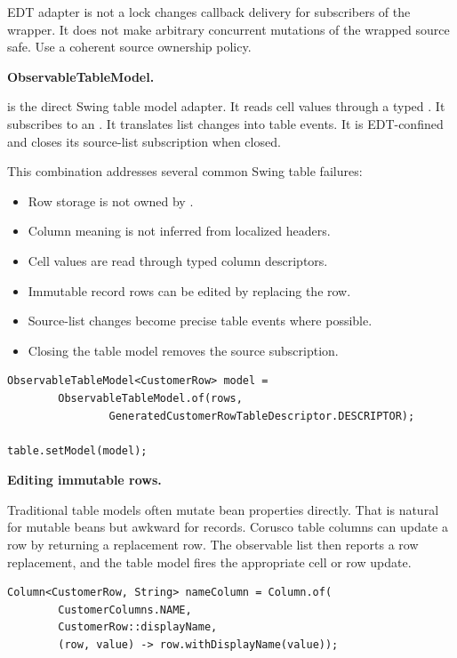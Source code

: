 \begin{pitfallbox}{EDT adapter is not a lock}
 changes callback delivery for subscribers of the
wrapper. It does not make arbitrary concurrent mutations of the wrapped source
safe. Use a coherent source ownership policy.
\end{pitfallbox}

\textbf{ObservableTableModel.}

 is the direct Swing table model adapter. It reads
cell values through a typed . It subscribes to an
. It translates list changes into table events. It is
EDT-confined and closes its source-list subscription when closed.

This combination addresses several common Swing table failures:

\begin{itemize}
\item Row storage is not owned by .
\item Column meaning is not inferred from localized headers.
\item Cell values are read through typed column descriptors.
\item Immutable record rows can be edited by replacing the row.
\item Source-list changes become precise table events where possible.
\item Closing the table model removes the source subscription.
\end{itemize}

\begin{lstlisting}[caption={Descriptor-backed observable table model.}]
ObservableTableModel<CustomerRow> model =
        ObservableTableModel.of(rows,
                GeneratedCustomerRowTableDescriptor.DESCRIPTOR);

table.setModel(model);
\end{lstlisting}

\textbf{Editing immutable rows.}

Traditional table models often mutate bean properties directly. That is natural
for mutable beans but awkward for records. Corusco table columns can update a
row by returning a replacement row. The observable list then reports a row
replacement, and the table model fires the appropriate cell or row update.

\begin{lstlisting}[caption={Conceptual immutable-row edit.}]
Column<CustomerRow, String> nameColumn = Column.of(
        CustomerColumns.NAME,
        CustomerRow::displayName,
        (row, value) -> row.withDisplayName(value));
\end{lstlisting}

